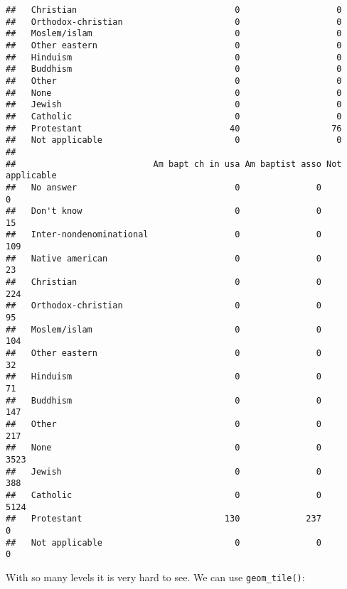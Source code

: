 \documentclass[]{article}
\theoremstyle{definition}
\theoremstyle{definition}
\theoremstyle{definition}
\theoremstyle{remark}
\begin{document}
\begin{verbatim}
##   Christian                               0                   0
##   Orthodox-christian                      0                   0
##   Moslem/islam                            0                   0
##   Other eastern                           0                   0
##   Hinduism                                0                   0
##   Buddhism                                0                   0
##   Other                                   0                   0
##   None                                    0                   0
##   Jewish                                  0                   0
##   Catholic                                0                   0
##   Protestant                             40                  76
##   Not applicable                          0                   0
##                          
##                           Am bapt ch in usa Am baptist asso Not applicable
##   No answer                               0               0              0
##   Don't know                              0               0             15
##   Inter-nondenominational                 0               0            109
##   Native american                         0               0             23
##   Christian                               0               0            224
##   Orthodox-christian                      0               0             95
##   Moslem/islam                            0               0            104
##   Other eastern                           0               0             32
##   Hinduism                                0               0             71
##   Buddhism                                0               0            147
##   Other                                   0               0            217
##   None                                    0               0           3523
##   Jewish                                  0               0            388
##   Catholic                                0               0           5124
##   Protestant                            130             237              0
##   Not applicable                          0               0              0
\end{verbatim}

With so many levels it is very hard to see. We can use
\texttt{geom\_tile()}:
\end{document}
